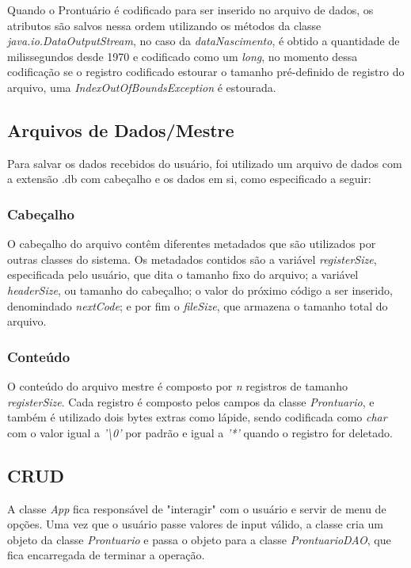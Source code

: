 Quando o Prontuário é codificado para ser inserido no arquivo de dados, os atributos são salvos nessa ordem utilizando os métodos da classe \textit{java.io.DataOutputStream}, no caso da \textit{dataNascimento}, é obtido a quantidade de milissegundos desde 1970 e codificado como um \textit{long}, no momento dessa codificação se o registro codificado estourar o tamanho pré-definido de registro do arquivo, uma \textit{IndexOutOfBoundsException} é estourada.

\subsection{\esp Arquivos de Dados/Mestre}

Para salvar os dados recebidos do usuário, foi utilizado um arquivo de dados com a extensão .db com cabeçalho e os dados em si, como especificado a seguir:

\subsubsection{\esp Cabeçalho}

O cabeçalho do arquivo contêm diferentes metadados que são utilizados por outras classes do sistema. Os metadados contidos são a variável \textit{registerSize}, especificada pelo usuário, que dita o tamanho fixo do arquivo; a variável \textit{headerSize}, ou tamanho do cabeçalho; o valor do próximo código a ser inserido, denomindado \textit{nextCode}; e por fim o \textit{fileSize}, que armazena o tamanho total do arquivo. 

\subsubsection{\esp Conteúdo}

O conteúdo do arquivo mestre é composto por \textit{n} registros de tamanho \textit{registerSize}. Cada registro é composto pelos campos da classe \textit{Prontuario}, e também é utilizado dois bytes extras como lápide, sendo codificada como \textit{char} com o valor igual a \textit{'\textbackslash0'} por padrão e igual a \textit{'*'} quando o registro for deletado.

\subsection{\esp CRUD}
A classe \textit{App} fica responsável de "interagir" com o usuário e servir de menu de opções. Uma vez que o usuário passe valores de input válido, a classe cria um objeto da classe \textit{Prontuario} e passa o objeto para a classe \textit{ProntuarioDAO}, que fica encarregada de terminar a operação.

